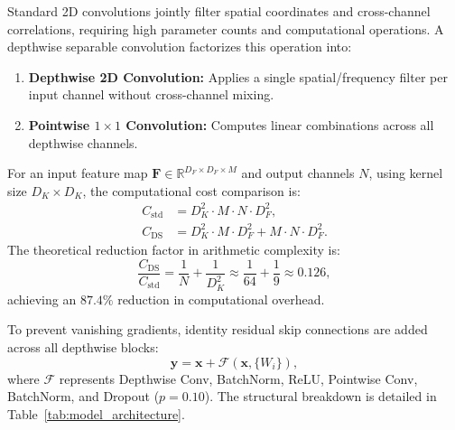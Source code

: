 \documentclass[10pt,twocolumn,letterpaper]{article}
\begin{document}
Standard 2D convolutions jointly filter spatial coordinates and cross-channel correlations, requiring high parameter counts and computational operations. A depthwise separable convolution factorizes this operation into:
\begin{enumerate}
    \item \textbf{Depthwise 2D Convolution:} Applies a single spatial/frequency filter per input channel without cross-channel mixing.
    \item \textbf{Pointwise $1 \times 1$ Convolution:} Computes linear combinations across all depthwise channels.
\end{enumerate}

For an input feature map $\mathbf{F} \in \mathbb{R}^{D_F \times D_F \times M}$ and output channels $N$, using kernel size $D_K \times D_K$, the computational cost comparison is:
\begin{align}
    C_{\text{std}} &= D_K^2 \cdot M \cdot N \cdot D_F^2, \\
    C_{\text{DS}} &= D_K^2 \cdot M \cdot D_F^2 + M \cdot N \cdot D_F^2.
\end{align}
The theoretical reduction factor in arithmetic complexity is:
\begin{equation}
    \frac{C_{\text{DS}}}{C_{\text{std}}} = \frac{1}{N} + \frac{1}{D_K^2} \approx \frac{1}{64} + \frac{1}{9} \approx 0.126,
\end{equation}
achieving an $87.4\%$ reduction in computational overhead.

To prevent vanishing gradients, identity residual skip connections are added across all depthwise blocks:
\begin{equation}
    \mathbf{y} = \mathbf{x} + \mathcal{F}(\mathbf{x}, \{W_i\}),
\end{equation}
where $\mathcal{F}$ represents Depthwise Conv, BatchNorm, ReLU, Pointwise Conv, BatchNorm, and Dropout ($p = 0.10$). The structural breakdown is detailed in Table~\ref{tab:model_architecture}.
\end{document}
